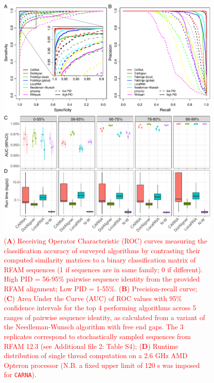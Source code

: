 \documentclass{bmcart}
\newcommand\carna{\texttt{CARNA}}
\begin{document}
\begin{backmatter}
\begin{figure}[h!]
 \includegraphics[width=\textwidth]{Fig3}
 \caption {
  \textcolor{red} {
 (\textbf{A}) Receiving Operator Characteristic (ROC) curves measuring the classification
 accuracy of surveyed algorithms by contrasting their computed similarity matrices 
 to a binary classification matrix of RFAM  sequences (1 if sequences are in same family; 
 0 if different). High PID =  56-95\% pairwise sequence identity from the provided RFAM alignment; Low PID  = 1-55\%.
 (\textbf{B}) Precision-recall curve;  
 (\textbf{C}) Area Under the Curve (AUC) of ROC values with 95\% confidence intervals 
for the top 4 performing algorithms across 5 ranges of pairwise sequence identity, 
 as calculated from a variant of the Needleman-Wunsch algorithm with free end gaps. 
 The 3 replicates correspond to stochastically sampled sequences from RFAM 12.3  (see Additional file 2: Table S4); 
 (\textbf{D}) Runtime distribution of single thread computation on a 2.6 GHz AMD Opteron processor 
 (N.B. a fixed upper limit of 120 s was  imposed for \carna{}). }  }
\end{figure}



\end{backmatter}
\end{document}
